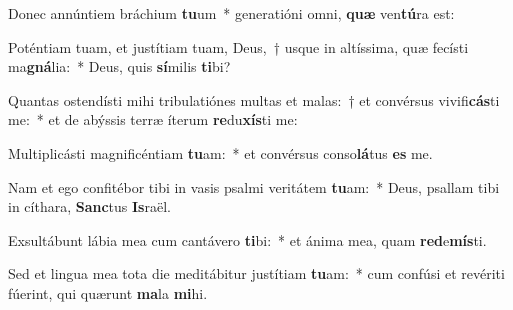 \item Donec annúntiem bráchium \textbf{tu}um~* generatióni omni, \textbf{quæ} ven\textbf{tú}ra est:
\item Poténtiam tuam, et justítiam tuam, Deus,~† usque in altíssima, quæ fecísti ma\textbf{gná}lia:~* Deus, quis \textbf{sí}milis \textbf{ti}bi?
\item Quantas ostendísti mihi tribulatiónes multas et malas:~† et convérsus vivifi\textbf{cás}ti me:~* et de abýssis terræ íterum \textbf{re}du\textbf{xís}ti me:
\item Multiplicásti magnificéntiam \textbf{tu}am:~* et convérsus conso\textbf{lá}tus \textbf{es} me.
\item Nam et ego confitébor tibi in vasis psalmi veritátem \textbf{tu}am:~* Deus, psallam tibi in cíthara, \textbf{Sanc}tus \textbf{Is}raël.
\item Exsultábunt lábia mea cum cantávero \textbf{ti}bi:~* et ánima mea, quam \textbf{red}e\textbf{mís}ti.
\item Sed et lingua mea tota die meditábitur justítiam \textbf{tu}am:~* cum confúsi et revériti fúerint, qui quærunt \textbf{ma}la \textbf{mi}hi.
